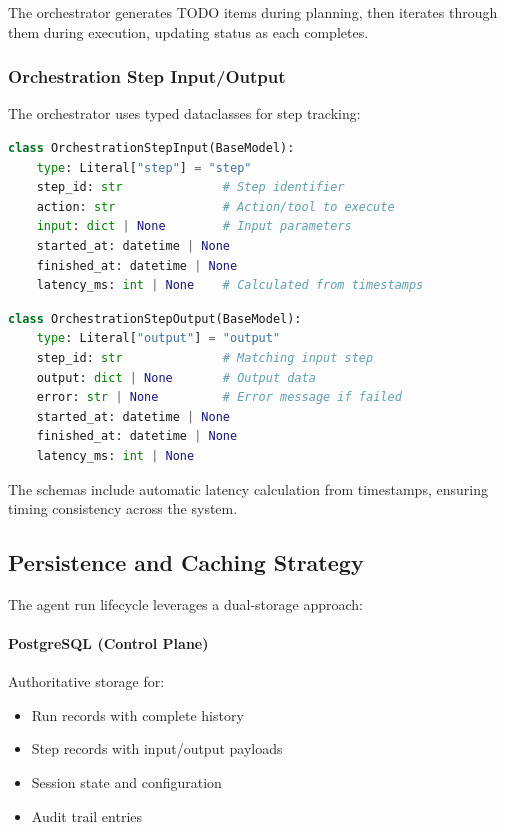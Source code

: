 The orchestrator generates TODO items during planning, then iterates through them during execution, updating status as each completes.

\subsubsection{Orchestration Step Input/Output}

The orchestrator uses typed dataclasses for step tracking:

\begin{lstlisting}[language=Python, caption={OrchestrationStepInput schema}, label=lst:orch-step-input]
class OrchestrationStepInput(BaseModel):
    type: Literal["step"] = "step"
    step_id: str              # Step identifier
    action: str               # Action/tool to execute
    input: dict | None        # Input parameters
    started_at: datetime | None
    finished_at: datetime | None
    latency_ms: int | None    # Calculated from timestamps
\end{lstlisting}

\begin{lstlisting}[language=Python, caption={OrchestrationStepOutput schema}, label=lst:orch-step-output]
class OrchestrationStepOutput(BaseModel):
    type: Literal["output"] = "output"
    step_id: str              # Matching input step
    output: dict | None       # Output data
    error: str | None         # Error message if failed
    started_at: datetime | None
    finished_at: datetime | None
    latency_ms: int | None
\end{lstlisting}

The schemas include automatic latency calculation from timestamps, ensuring timing consistency across the system.

\subsection{Persistence and Caching Strategy}

The agent run lifecycle leverages a dual-storage approach:

\paragraph{PostgreSQL (Control Plane)} Authoritative storage for:
\begin{itemize}
    \item Run records with complete history
    \item Step records with input/output payloads
    \item Session state and configuration
    \item Audit trail entries
\end{itemize}

